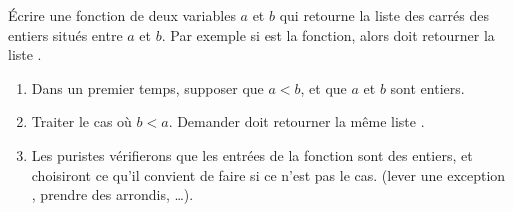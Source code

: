 
\begin{exercice}\label{exoPremiere-0027}

    Écrire une fonction de deux variables \( a\) et \( b\) qui retourne la liste des carrés des entiers situés entre \( a\) et \( b\). Par exemple si  est la fonction, alors  doit retourner la liste \info{[16,25,36,49,64]}.

    \begin{enumerate}
        \item
            Dans un premier temps, supposer que \( a<b\), et que \( a\) et \( b\) sont entiers.
        \item
            Traiter le cas où \( b<a\). Demander  doit retourner la même liste \info{[16,25,36,19,64]}.
        \item
            Les puristes vérifierons que les entrées de la fonction sont des entiers, et choisiront ce qu'il convient de faire si ce n'est pas le cas. (lever une exception , prendre des arrondis, \ldots).
    \end{enumerate}

\end{exercice}
